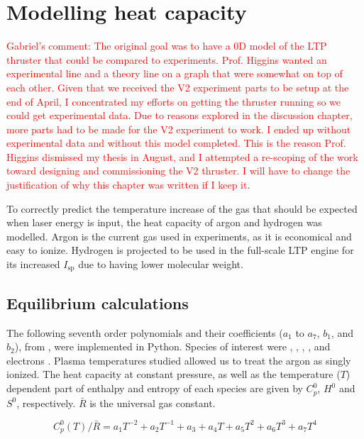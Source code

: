 \chapter{Modelling heat capacity} \label{chp:models}
    
    \textcolor{red}{Gabriel's comment: The original goal was to have a 0D model of the LTP thruster that could be compared to experiments. Prof. Higgins wanted an experimental line and a theory line on a graph that were somewhat on top of each other. Given that we received the V2 experiment parts to be setup at the end of April, I concentrated my efforts on getting the thruster running so we could get experimental data. Due to reasons explored in the discussion chapter, more parts had to be made for the V2 experiment to work. I ended up without experimental data and without this model completed. This is the reason Prof. Higgins dismissed my thesis in August, and I attempted a re-scoping of the work toward designing and commissioning the V2 thruster. I will have to change the justification of why this chapter was written if I keep it.}

    To correctly predict the temperature increase of the gas that should be expected when laser energy is input, the heat capacity of argon and hydrogen was modelled. Argon is the current gas used in experiments, as it is economical and easy to ionize. Hydrogen is projected to be used in the full-scale LTP engine for its increased $I_\mathrm{sp}$ due to having lower molecular weight.

    \section{Equilibrium calculations} \label{sec:equilibrium calcs}
        
        The following seventh order polynomials and their coefficients ($a_1$ to $a_7$, $b_1$, and $b_2$), from \textcite{mcbrideNASAGlennCoefficients2002}, were implemented in Python. Species of interest were , , , , and electrons . Plasma temperatures studied allowed us to treat the argon as singly ionized. The heat capacity at constant pressure, as well as the temperature ($T$) dependent part of enthalpy and entropy of each species are given by $C_p^0$, $H^0$ and $S^0$, respectively. $\bar R$ is the universal gas constant.

        \begin{equation}
            C_p^0 (T)/\bar R = a_1 T^{-2} + a_2 T^{-1} + a_3 + a_4   T + a_5 T^2 + a_6 T^3 + a_7 T^4
        \end{equation} 
        
